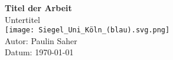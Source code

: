 \begin{titlepage}
\centering
\vspace*{1cm}


{\LARGE\bfseries Titel der Arbeit}\\[1cm]
{\large Untertitel}\\[2cm]
\texttt{[image: Siegel\_Uni\_Köln\_(blau).svg.png]}\\[2cm]
{\large Autor: Paulin Saher}\\[1cm]
{\large Datum: \today}
\end{titlepage}
